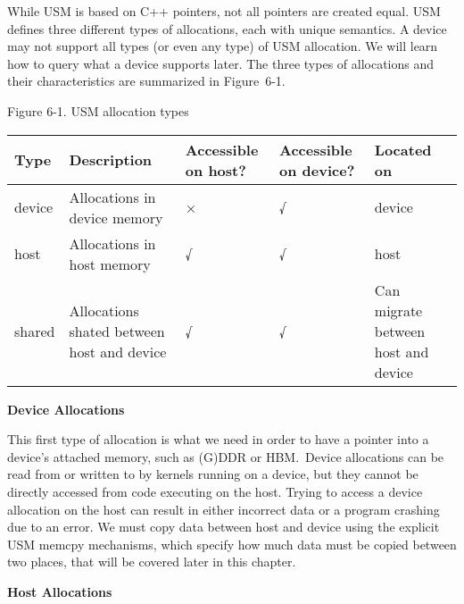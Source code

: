 While USM is based on C++ pointers, not all pointers are created equal. USM defines three different types of allocations, each with unique semantics. A device may not support all types (or even any type) of USM allocation. We will learn how to query what a device supports later. The three types of allocations and their characteristics are summarized in Figure 6-1.\par

\hspace*{\fill} \par %
Figure 6-1. USM allocation types
\begin{table}[]
	\begin{tabular}{|l|l|l|l|l|}
		\hline
		Type   & Description                                & Accessible on host? & Accessible on device? & Located on                          \\ \hline
		device & Allocations in device memory               & ×                   & √                     & device                              \\ \hline
		host   & Allocations in host memory                 & √                   & √                     & host                                \\ \hline
		shared & Allocations shated between host and device & √                   & √                     & Can migrate between host and device \\ \hline
	\end{tabular}
\end{table}

\hspace*{\fill} \par %
\textbf{Device Allocations}

This first type of allocation is what we need in order to have a pointer into a device’s attached memory, such as (G)DDR or HBM. Device allocations can be read from or written to by kernels running on a device, but they cannot be directly accessed from code executing on the host. Trying to access a device allocation on the host can result in either incorrect data or a program crashing due to an error. We must copy data between host and device using the explicit USM memcpy mechanisms, which specify how much data must be copied between two places, that will be covered later in this chapter.\par

\hspace*{\fill} \par %
\textbf{Host Allocations}

